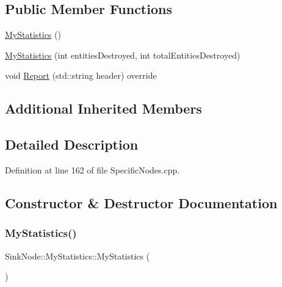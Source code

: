\subsection*{Public Member Functions}
\begin{DoxyCompactItemize}
\item 
\hyperlink{class_sink_node_1_1_my_statistics_ab4e38f010b77fe552a89f4462ea70378}{My\+Statistics} ()
\item 
\hyperlink{class_sink_node_1_1_my_statistics_af8352a16e20eab800737612436be103e}{My\+Statistics} (int entities\+Destroyed, int total\+Entities\+Destroyed)
\item 
void \hyperlink{class_sink_node_1_1_my_statistics_acd304ae3a9892c9de454dc7ee36a942b}{Report} (std\+::string header) override
\end{DoxyCompactItemize}
\subsection*{Additional Inherited Members}


\subsection{Detailed Description}


Definition at line 162 of file Specific\+Nodes.\+cpp.



\subsection{Constructor \& Destructor Documentation}
\mbox{\label{class_sink_node_1_1_my_statistics_ab4e38f010b77fe552a89f4462ea70378}} 
\subsubsection{\texorpdfstring{My\+Statistics()}{MyStatistics()}\hspace{0.1cm}{\footnotesize\ttfamily [1/2]}}
{\footnotesize\ttfamily Sink\+Node\+::\+My\+Statistics\+::\+My\+Statistics (\begin{DoxyParamCaption}{ }\end{DoxyParamCaption})\hspace{0.3cm}{\ttfamily [inline]}}



